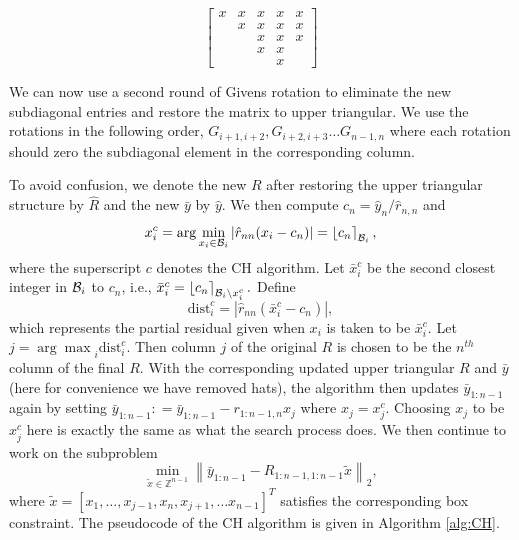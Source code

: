 \documentclass[12pt,Bold,letterpaper]{mcgilletdclass}
\newcommand{\be}{\begin{equation}}
\newcommand{\ee}{\end{equation}}
\newcommand{\dist}{\mathrm{dist}}
\begin{document}
\begin{equation} \label{eq:subDiagEntries}
\begin{bmatrix}
x & x & x & x & x \\ 
  & x & x & x & x \\ 
  &   & x & x & x \\ 
  &   & x & x &   \\ 
  &   &  &  x & 
\end{bmatrix}
\end{equation}

We can now use a second round of Givens rotation to eliminate the new subdiagonal entries and restore the matrix to upper triangular. We use the rotations in the following order, $G_{i+1,i+2}, G_{i+2,i+3} \dots G_{n-1,n}$ where each rotation should zero the subdiagonal element in the corresponding column.

To avoid confusion, we denote the new $R$ after restoring the upper triangular structure by $\hat{R}$ and the new $\bar{y}$ by $\hat{y}$.
We then compute  $c_n=\hat{y}_n/\hat{r}_{n,n}$ and 
\be
x_i^c=\arg\min_{x_i\in {\cal B}_i}\left |\hat{r}_{nn}(x_i- c_n) \right | = \left \lfloor c_n \right \rceil_{{\cal B}_i},
\label{eq:xic}
\ee
where the superscript $c$ denotes the CH algorithm. 
Let $\bar{x}_i^c$ be the second closest integer in ${{\cal B}_i}$ to $c_n$,
i.e.,  
$\bar{x}_i^c= \left \lfloor c_n \right \rceil_{{\cal B}_i\backslash x_i^c}.$
Define
\be
\dist_i^c = |\hat{r}_{nn}( \bar{x}_i^c -c_n) |, 
\label{eq:dic}
\ee
which represents the partial residual given when $x_i$ is taken to be $\bar{x}_i^c$.
Let $j = {\arg\max}_i \dist_i^c$.
Then  column $j$ of the original $R$ is chosen to be the $n^{th}$ column of the final $R$.
With the corresponding updated upper triangular $R$ and $\bar{y}$
(here for convenience we have removed hats),
the algorithm then updates  $\bar{y}_{1:n-1}$ again
by setting $\bar{y}_{1:n-1}: = \bar{y}_{1:n-1} - r_{1:n-1,n}x_j$ where $x_j=x_j^c$. 
Choosing  $x_j$ to be  $x_j^c$ here is exactly the same as what the search process does.
We then continue to work on the subproblem 
\be
\min_{\tilde{x}\in \mathbb{Z}^{n-1}} \left \| \bar{y}_{1:n-1}-R_{1:n-1,1:n-1}\tilde{x} \right \|_2,
\label{eq:subc}
\ee
where $\tilde{x}=[x_1,\ldots, x_{j-1}, x_n, x_{j+1}, \ldots x_{n-1}]^T$ satisfies the corresponding box constraint.
The pseudocode of the CH algorithm is given in Algorithm \ref{alg:CH}.
\end{document}
